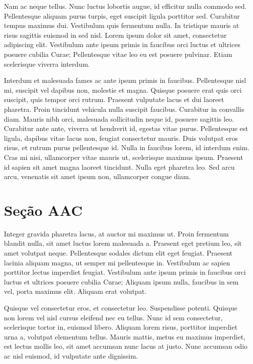 \documentclass{article}
\begin{document}
	Nam ac neque tellus. Nunc luctus lobortis augue, id efficitur nulla commodo sed. Pellentesque aliquam purus turpis, eget suscipit ligula porttitor sed. Curabitur tempus maximus dui. Vestibulum quis fermentum nulla. In tristique mauris at risus sagittis euismod in sed nisl. Lorem ipsum dolor sit amet, consectetur adipiscing elit. Vestibulum ante ipsum primis in faucibus orci luctus et ultrices posuere cubilia Curae; Pellentesque vitae leo eu est posuere pulvinar. Etiam scelerisque viverra interdum.
	
	Interdum et malesuada fames ac ante ipsum primis in faucibus. Pellentesque nisl mi, suscipit vel dapibus non, molestie et magna. Quisque posuere erat quis orci suscipit, quis tempor orci rutrum. Praesent vulputate lacus et dui laoreet pharetra. Proin tincidunt vehicula nulla suscipit faucibus. Curabitur in convallis diam. Mauris nibh orci, malesuada sollicitudin neque id, posuere sagittis leo. Curabitur ante ante, viverra ut hendrerit id, egestas vitae purus. Pellentesque est ligula, dapibus vitae lacus non, feugiat consectetur mauris. Duis volutpat eros risus, et rutrum purus pellentesque id. Nulla in faucibus lorem, id interdum enim. Cras mi nisi, ullamcorper vitae mauris ut, scelerisque maximus ipsum. Praesent id sapien sit amet magna laoreet tincidunt. Nulla eget pharetra leo. Sed arcu arcu, venenatis sit amet ipsum non, ullamcorper congue diam.
	
	\section{Seção AAC}
	
	Integer gravida pharetra lacus, at auctor mi maximus ut. Proin fermentum blandit nulla, sit amet luctus lorem malesuada a. Praesent eget pretium leo, sit amet volutpat neque. Pellentesque sodales dictum elit eget feugiat. Praesent lacinia aliquam magna, ut semper mi pellentesque in. Vestibulum ac sapien porttitor lectus imperdiet feugiat. Vestibulum ante ipsum primis in faucibus orci luctus et ultrices posuere cubilia Curae; Aliquam ipsum nulla, faucibus in sem vel, porta maximus elit. Aliquam erat volutpat.
	
	Quisque vel consectetur eros, et consectetur leo. Suspendisse potenti. Quisque non lorem vel nisl cursus eleifend nec eu tellus. Nunc id sem consectetur, scelerisque tortor in, euismod libero. Aliquam lorem risus, porttitor imperdiet urna a, volutpat elementum tellus. Mauris mattis, metus eu maximus imperdiet, est lectus mollis leo, sit amet accumsan nunc lacus at justo. Nunc accumsan odio ac nisl euismod, id vulputate ante dignissim.
	
\end{document}
